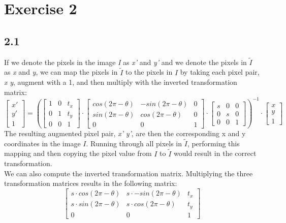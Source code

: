 \section{Exercise 2}
\subsection*{2.1}
If we denote the pixels in the image \textit{I} as \textit{x'} and \textit{y'} and we denote the pixels in $\tilde{I}$ as \textit{x} and \textit{y}, we can map the pixels in $\tilde{I}$ to the pixels in $I$ by taking each pixel pair, \textit{x} \textit{y}, augment with a 1, and then multiply with the inverted transformation matrix:
\begin{equation*}
	\begin{bmatrix}
		x'\\
		y'\\
		1
	\end{bmatrix} = \left(
	\begin{bmatrix}
		1&0&t_x\\
		0&1&t_y\\
		0&0&1
	\end{bmatrix} \cdot
	\begin{bmatrix}
		cos(2\pi-\theta)&-sin(2\pi-\theta)&0\\
		sin(2\pi-\theta)&cos(2\pi-\theta)&0\\
		0&0&1
	\end{bmatrix} \cdot
	\begin{bmatrix}
 		s&0&0\\
 		0&s&0\\
 		0&0&1
 	\end{bmatrix} \right)^{-1}	\cdot
	\begin{bmatrix}
		x\\
		y\\
		1
	\end{bmatrix}
\end{equation*}
The resulting augmented pixel pair, \textit{x'} \textit{y'}, are then the corresponding x and y coordinates in the image $\textit{I}$. Running through all pixels in $\tilde{I}$, performing this mapping and then copying the pixel value from $I$ to $\tilde{I}$ would result in the correct transformation.\\
We can also compute the inverted transformation matrix. Multiplying the three transformation matrices results in the following matrix:
\begin{equation*}
	\begin{bmatrix}
		s\cdot cos(2\pi-\theta)&s\cdot -sin(2\pi-\theta)&t_x\\
		s\cdot sin(2\pi-\theta)&s\cdot cos(2\pi-\theta)&t_y\\
		0&0&1
	\end{bmatrix}
\end{equation*}
